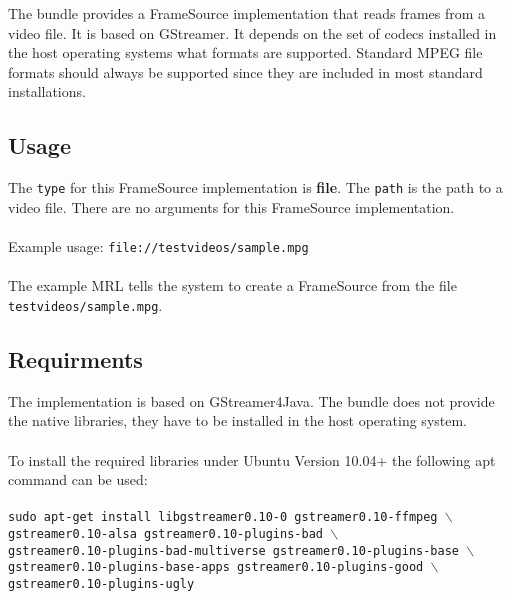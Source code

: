 
The bundle provides a FrameSource implementation that reads frames from a video file. It is based on GStreamer. It depends on the set of codecs installed in the host operating systems what formats are supported. Standard MPEG file formats should always be supported since they are included in most standard installations. 

\subsection{Usage}

The \texttt{type} for this FrameSource implementation is \textbf{file}. The \texttt{path} is the path to a video file. There are no arguments for this FrameSource implementation. 
\\~\\
Example usage: \hspace{30pt} \texttt{file://testvideos/sample.mpg}
\\~\\
The example MRL tells the system to create a FrameSource from the file \texttt{testvideos/sample.mpg}.

\subsection{Requirments}

The implementation is based on GStreamer4Java. The bundle does not provide the native libraries, they have to be installed in the host operating system.
\\~\\
To install the required libraries under Ubuntu Version 10.04+ the following apt command can be used:
\\~\\
\texttt{sudo apt-get install libgstreamer0.10-0 gstreamer0.10-ffmpeg $\backslash$ \\
gstreamer0.10-alsa gstreamer0.10-plugins-bad $\backslash$ \\
gstreamer0.10-plugins-bad-multiverse gstreamer0.10-plugins-base $\backslash$ \\
gstreamer0.10-plugins-base-apps gstreamer0.10-plugins-good $\backslash$ \\
gstreamer0.10-plugins-ugly}

